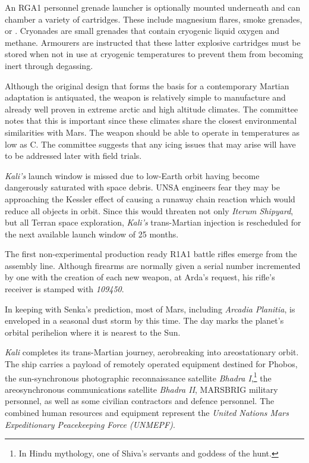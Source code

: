 An RGA1 personnel grenade launcher is optionally mounted underneath and can chamber a variety of cartridges. These include magnesium flares, smoke grenades, or . Cryonades are small grenades that contain cryogenic liquid oxygen and methane. Armourers are instructed that these latter explosive cartridges must be stored when not in use at cryogenic temperatures to prevent them from becoming inert through degassing.

Although the original design that forms the basis for a contemporary Martian adaptation is antiquated, the weapon is relatively simple to manufacture and already well proven in extreme arctic and high altitude climates. The committee notes that this is important since these climates share the closest environmental similarities with Mars. The weapon should be able to operate in temperatures as low as C. The committee suggests that any icing issues that may arise will have to be addressed later with field trials.
\StopTimelineDate

{\it Kali's} launch window is missed due to low-Earth orbit having become dangerously saturated with space debris. UNSA engineers fear they may be approaching the Kessler effect of causing a runaway chain reaction which would reduce all objects in orbit. Since this would threaten not only {\it Iterum Shipyard}, but all Terran space exploration, {\it Kali's} trans-Martian injection is rescheduled for the next available launch window of 25 months.
\StopTimelineDate

The first non-experimental production ready R1A1 battle rifles emerge from the assembly line. Although firearms are normally given a serial number incremented by one with the creation of each new weapon, at Arda's request, his rifle's receiver is stamped with {\it 109450}.
\StopTimelineDate

In keeping with Senka's prediction, most of Mars, including {\it Arcadia Planitia}, is enveloped in a seasonal dust storm by this time. The day marks the planet's orbital perihelion where it is nearest to the Sun.
\StopTimelineDate

{\it Kali} completes its trans-Martian journey, aerobreaking into areostationary orbit. The ship carries a payload of remotely operated equipment destined for Phobos, the sun-synchronous photographic reconnaissance satellite {\it Bhadra I},\footnote{In Hindu mythology, one of Shiva's servants and goddess of the hunt.} the areosynchronous communications satellite {\it Bhadra II}, MARSBRIG military personnel, as well as some civilian contractors and defence personnel. The combined human resources and equipment represent the {\it United Nations Mars Expeditionary Peacekeeping Force (UNMEPF)}.
\StopTimelineDate

